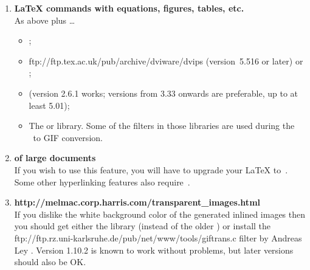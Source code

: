 \begin{enumerate}
%
%
%
\item 
\textbf{\LaTeX{}  commands with equations, figures, tables, etc.} \\
As above plus \dots
%
\begin{itemize}
\item {};
%
\item 
{}
{ftp://ftp.tex.ac.uk/pub/archive/dviware/dvips}
(version~5.516 or later) or ;
%
\item 
{}  (version 2.6.1 works;
versions from 3.33 onwards are preferable, up to at least 5.01);
%
%
%
\item 
The 
or  library.
Some of the filters in those libraries are used during the \PS\ to
GIF conversion. 
\end{itemize}


%
%
\item 
\textbf{ of large documents}\\
If you wish to use this feature, you will have to upgrade your
\LaTeX{} to \LaTeXe\,. 
Some other hyperlinking features also require \LaTeXe\,.

%
%
\item 
\textbf{%
{http://melmac.corp.harris.com/transparent\_images.html}}\\
If you dislike the white background color of the
generated inlined images then you should get either 
the  library (instead of the older ) 
or install the %
{ftp://ftp.rz.uni-karlsruhe.de/pub/net/www/tools/giftrans.c}
filter by Andreas Ley . 
Version 1.10.2 is known to work without problems, 
but later versions should also be OK.
%
\end{enumerate} 

%

